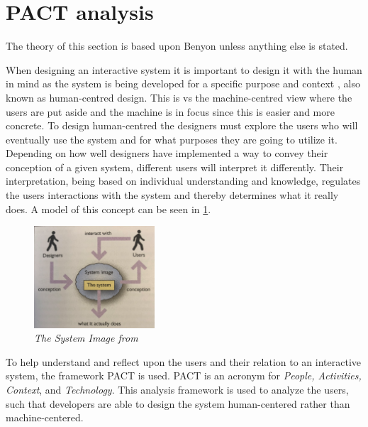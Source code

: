 
\section{PACT analysis}\label{sec:PACT}
The theory of this section is based upon Benyon \cite{Benyon} unless anything else is stated.

When designing an interactive system it is important to design it with the human in mind as the system is being developed for a specific purpose and context
, also known as human-centred design.
This is vs the machine-centred view where the users are put aside and the machine is in focus since this is easier and more concrete.
To design human-centred the designers must explore the users who will eventually use the system and for what purposes they are going to utilize it.
Depending on how well designers have implemented a way to convey their conception of a given system, different users will interpret it differently.
Their interpretation, being based on individual understanding and knowledge, regulates the users interactions with the system and thereby determines what it really does.
A model of this concept can be seen in \cref{fig:PACT-SystemImage}.

\begin{figure}[H]
	\centering
	\includegraphics[width=0.4\textwidth]{billeder/SystemImage-Benyon.png}
	\caption{\textit{The System Image from \citep[p.~31]{Benyon}}}
	\label{fig:PACT-SystemImage}
\end{figure}

To help understand and reflect upon the users and their relation to an interactive system, the framework PACT is used.
PACT is an acronym for \textit{People, Activities, Context}, and \textit{Technology}.
This analysis framework is used to analyze the users, such that developers are able to design the system human-centered rather than machine-centered.

